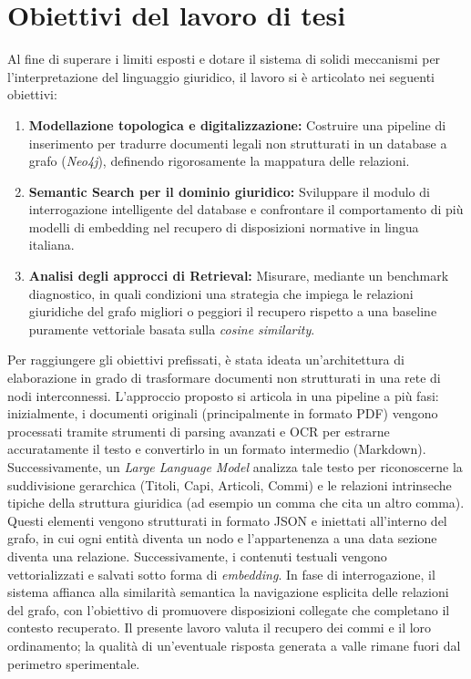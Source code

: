 \section{Obiettivi del lavoro di tesi}
Al fine di superare i limiti esposti e dotare il sistema di solidi meccanismi per l'interpretazione del linguaggio giuridico, il lavoro si è articolato nei seguenti obiettivi:
\begin{enumerate}
    \item \textbf{Modellazione topologica e digitalizzazione:} Costruire una pipeline di inserimento per tradurre documenti legali non strutturati in un database a grafo (\textit{Neo4j}), definendo rigorosamente la mappatura delle relazioni.
    \item \textbf{Semantic Search per il dominio giuridico:} Sviluppare il modulo di interrogazione intelligente del database e confrontare il comportamento di più modelli di embedding nel recupero di disposizioni normative in lingua italiana.
    \item \textbf{Analisi degli approcci di Retrieval:} Misurare, mediante un benchmark diagnostico, in quali condizioni una strategia che impiega le relazioni giuridiche del grafo migliori o peggiori il recupero rispetto a una baseline puramente vettoriale basata sulla \textit{cosine similarity}.
\end{enumerate}

Per raggiungere gli obiettivi prefissati, è stata ideata un'architettura di elaborazione in grado di trasformare documenti non strutturati in una rete di nodi interconnessi. L'approccio proposto si articola in una pipeline a più fasi: inizialmente, i documenti originali (principalmente in formato PDF) vengono processati tramite strumenti di parsing avanzati e OCR per estrarne accuratamente il testo e convertirlo in un formato intermedio (Markdown). Successivamente, un \textit{Large Language Model} analizza tale testo per riconoscerne la suddivisione gerarchica (Titoli, Capi, Articoli, Commi) e le relazioni intrinseche tipiche della struttura giuridica (ad esempio un comma che cita un altro comma).
Questi elementi vengono strutturati in formato JSON e iniettati all'interno del grafo, in cui ogni entità diventa un nodo e l'appartenenza a una data sezione diventa una relazione. Successivamente, i contenuti testuali vengono vettorializzati e salvati sotto forma di \textit{embedding}.
In fase di interrogazione, il sistema affianca alla similarità semantica la navigazione esplicita delle relazioni del grafo, con l'obiettivo di promuovere disposizioni collegate che completano il contesto recuperato. Il presente lavoro valuta il recupero dei commi e il loro ordinamento; la qualità di un'eventuale risposta generata a valle rimane fuori dal perimetro sperimentale.

